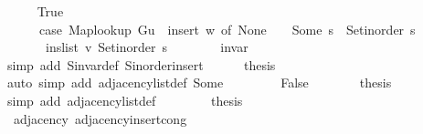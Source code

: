 \begin{isabellebody}
\ \ \ \ \isamarkupfalse%
\ True\isanewline
\ \ \ \ \isamarkupfalse%
\isanewline
\ \ \ \ \ \ {\isachardoublequoteopen}{\isacharparenleft}{\kern0pt}case\ {\isacharparenleft}{\kern0pt}Map{\isacharunderscore}{\kern0pt}lookup\ G{\isacharparenleft}{\kern0pt}{\isacharquery}{\kern0pt}u\ {\isasymmapsto}\ {\isacharquery}{\kern0pt}insert{\isacharparenright}{\kern0pt}{\isacharparenright}{\kern0pt}\ w\ of\ None\ {\isasymRightarrow}\ {\isacharbrackleft}{\kern0pt}{\isacharbrackright}{\kern0pt}\ {\isacharbar}{\kern0pt}\ Some\ s\ {\isasymRightarrow}\ Set{\isacharunderscore}{\kern0pt}inorder\ s{\isacharparenright}{\kern0pt}\ {\isacharequal}{\kern0pt}\isanewline
\ \ \ \ \ \ \ ins{\isacharunderscore}{\kern0pt}list\ {\isacharquery}{\kern0pt}v\ {\isacharparenleft}{\kern0pt}Set{\isacharunderscore}{\kern0pt}inorder\ s{\isacharparenright}{\kern0pt}{\isachardoublequoteclose}\isanewline
\ \ \ \ \ \ \isamarkupfalse%
\ invar\isanewline
\ \ \ \ \ \ \isamarkupfalse%
\ {\isacharparenleft}{\kern0pt}simp\ add{\isacharcolon}{\kern0pt}\ S{\isachardot}{\kern0pt}invar{\isacharunderscore}{\kern0pt}def\ S{\isachardot}{\kern0pt}inorder{\isacharunderscore}{\kern0pt}insert{\isacharparenright}{\kern0pt}\isanewline
\ \ \ \ \isamarkupfalse%
\ {\isacharquery}{\kern0pt}thesis\isanewline
\ \ \ \ \ \ \isamarkupfalse%
\ {\isacharparenleft}{\kern0pt}auto\ simp\ add{\isacharcolon}{\kern0pt}\ adjacency{\isacharunderscore}{\kern0pt}list{\isacharunderscore}{\kern0pt}def\ Some{\isacharparenright}{\kern0pt}\isanewline
\ \ \isamarkupfalse%
\isanewline
\ \ \ \ \isamarkupfalse%
\ False\isanewline
\ \ \ \ \isamarkupfalse%
\ \isamarkupfalse%
\ {\isacharquery}{\kern0pt}thesis\isanewline
\ \ \ \ \ \ \isamarkupfalse%
\ {\isacharparenleft}{\kern0pt}simp\ add{\isacharcolon}{\kern0pt}\ adjacency{\isacharunderscore}{\kern0pt}list{\isacharunderscore}{\kern0pt}def{\isacharparenright}{\kern0pt}\isanewline
\ \ \isamarkupfalse%
\isanewline
\ \ \isamarkupfalse%
\ \isamarkupfalse%
\ {\isacharquery}{\kern0pt}thesis\isanewline
\ \ \ \ \isacommand{{\isachardot}{\kern0pt}}\isamarkupfalse%
\isanewline
{}\isamarkupfalse%
%
\endisatagproof
{\isafoldproof}%
%
\isadelimproof
\isanewline
%
\endisadelimproof
\isanewline
{}\isamarkupfalse%
\ {\isacharparenleft}{\kern0pt}\ adjacency{\isacharparenright}{\kern0pt}\ adjacency{\isacharunderscore}{\kern0pt}insert{\isacharunderscore}{\kern0pt}cong{\isacharcolon}{\kern0pt}\isanewline

\end{isabellebody}
